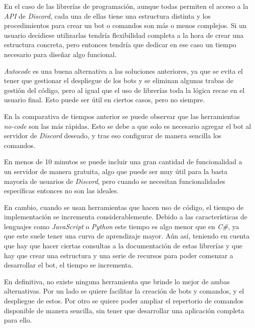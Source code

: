 En el caso de las librerías de programación, aunque todas permiten el acceso a la \textit{API} de \textit{Discord}, cada una de ellas tiene una estructura distinta y los procedimientos para crear un bot o comandos son más o menos complejos. Si un usuario decidiese utilizarlas tendría flexibilidad completa a la hora de crear una estructura concreta, pero entonces tendría que dedicar en ese caso un tiempo necesario para diseñar algo funcional.

\textit{Autocode} es una buena alternativa a las soluciones anteriores, ya que se evita el tener que gestionar el despliegue de los bots y se eliminan algunas trabas de gestión del código, pero al igual que el uso de librerías toda la lógica recae en el usuario final. Esto puede ser útil en ciertos casos, pero no siempre.

En la comparativa de tiempos anterior se puede observar que las herramientas \textit{no-code} son las más rápidas. Esto se debe a que solo es necesario agregar el bot al servidor de \textit{Discord} deseado, y tras eso configurar de manera sencilla los comandos.

En menos de 10 minutos se puede incluir una gran cantidad de funcionalidad a un servidor de manera gratuita, algo que puede ser muy útil para la basta mayoría de usuarios de \textit{Discord}, pero cuando se necesitan funcionalidades específicas entonces no son las ideales.

En cambio, cuando se usan herramientas que hacen uso de código, el tiempo de implementación se incrementa considerablemente. Debido a las características de lenguajes como \textit{JavaScript} o \textit{Python} este tiempo es algo menor que en \textit{C\#}, ya que este suele tener una curva de aprendizaje mayor. Aún así, teniendo en cuenta que hay que hacer ciertas consultas a la documentación de estas librerías y que hay que crear una estructura y una serie de recursos para poder comenzar a desarrollar el bot, el tiempo se incrementa.

En definitiva, no existe ninguna herramienta que brinde lo mejor de ambas alternativas. Por un lado se quiere facilitar la creación de bots y comandos, y el despliegue de estos. Por otro se quiere poder ampliar el repertorio de comandos disponible de manera sencilla, sin tener que desarrollar una aplicación completa para ello.
